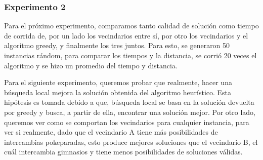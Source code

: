         \subsubsection{Experimento 2}

        Para el próximo experimento, comparamos tanto calidad de solución como tiempo de corrida de, por un lado los vecindarios entre sí, por otro los vecindarios y el algoritmo greedy, y finalmente los tres juntos. Para esto, se generaron 50 instancias rándom, para comparar los tiempos y la distancia, se corrió 20 veces el algoritmo y se hizo un promedio del tiempo y distancia.

        \par Para el siguiente experimento, queremos probar que realmente, hacer una búsqueda local mejora la solución obtenida del algoritmo heurístico. Esta hipótesis es tomada debido a que, búsqueda local se basa en la solución devuelta por greedy y busca, a partir de ella, encontrar una solución mejor. Por otro lado, queremos ver como se comportan los vecindarios para cualquier instancia, para ver si realmente, dado que el vecindario A tiene más posibilidades de intercambias pokeparadas, esto produce mejores soluciones que el vecindario B, el cuál intercambia gimnasios y tiene menos posibilidades de soluciones válidas.

